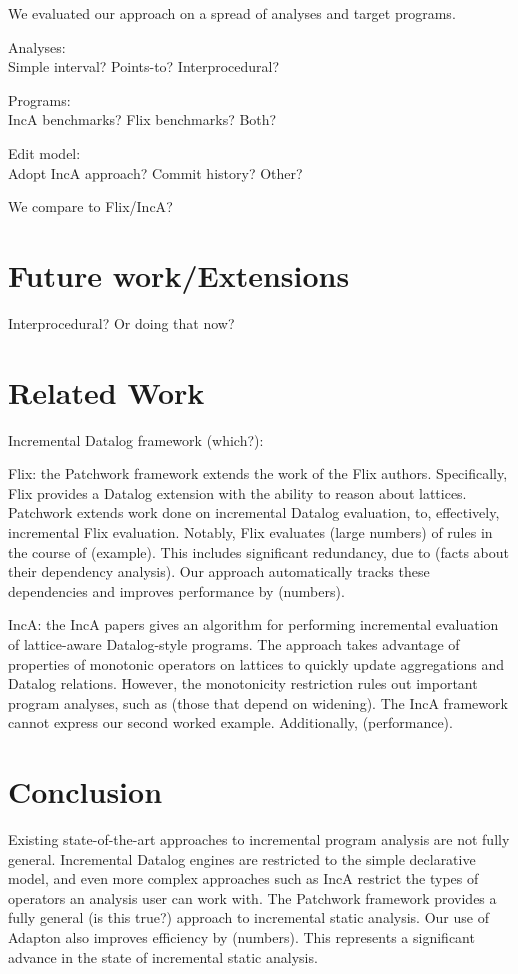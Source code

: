\documentclass[acmlarge,anonymous]{acmart}\settopmatter{printfolios=true}
\begin{document}
We evaluated our approach on a spread of analyses and target programs.

Analyses:\\
Simple interval? Points-to? Interprocedural?

Programs:\\
IncA benchmarks? Flix benchmarks? Both?

Edit model:\\
Adopt IncA approach? Commit history? Other?

We compare to {Flix/IncA}?

\section{Future work/Extensions}

Interprocedural? Or doing that now?

\section{Related Work}

Incremental Datalog framework (which?):

Flix: the Patchwork framework extends the work of the Flix authors. Specifically, Flix provides a Datalog extension with the ability to reason about lattices. Patchwork extends work done on incremental Datalog evaluation, to, effectively, incremental Flix evaluation. Notably, Flix evaluates (large numbers) of rules in the course of (example). This includes significant redundancy, due to (facts about their dependency analysis). Our approach automatically tracks these dependencies and improves performance by (numbers).

IncA: the IncA papers gives an algorithm for performing incremental evaluation of lattice-aware Datalog-style programs. The approach takes advantage of properties of monotonic operators on lattices to quickly update aggregations and Datalog relations. However, the monotonicity restriction rules out important program analyses, such as (those that depend on widening). The IncA framework cannot express our second worked example. Additionally, (performance).

\section{Conclusion}

Existing state-of-the-art approaches to incremental program analysis are not fully general. Incremental Datalog engines are restricted to the simple declarative model, and even more complex approaches such as IncA restrict the types of operators an analysis user can work with. The Patchwork framework provides a fully general (is this true?) approach to incremental static analysis. Our use of Adapton also improves efficiency by (numbers). This represents a significant advance in the state of incremental static analysis.
\end{document}
